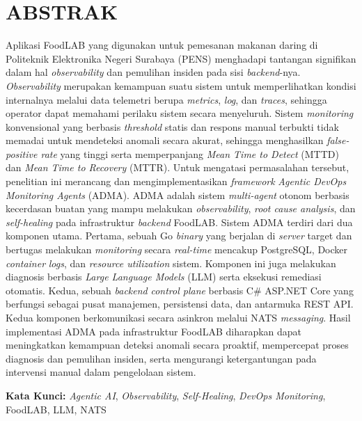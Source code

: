 \cleardoublepage
\chapter*{ABSTRAK}
\thispagestyle{fancy}

Aplikasi FoodLAB yang digunakan untuk pemesanan makanan daring di Politeknik Elektronika Negeri Surabaya (PENS) menghadapi tantangan signifikan dalam hal \textit{observability} dan pemulihan insiden pada sisi \textit{backend}-nya. \textit{Observability} merupakan kemampuan suatu sistem untuk memperlihatkan kondisi internalnya melalui data telemetri berupa \textit{metrics}, \textit{log}, dan \textit{traces}, sehingga operator dapat memahami perilaku sistem secara menyeluruh. Sistem \textit{monitoring} konvensional yang berbasis \textit{threshold} statis dan respons manual terbukti tidak memadai untuk mendeteksi anomali secara akurat, sehingga menghasilkan \textit{false-positive rate} yang tinggi serta memperpanjang \textit{Mean Time to Detect} (MTTD) dan \textit{Mean Time to Recovery} (MTTR). Untuk mengatasi permasalahan tersebut, penelitian ini merancang dan mengimplementasikan \textit{framework} \textit{Agentic DevOps Monitoring Agents} (ADMA). ADMA adalah sistem \textit{multi-agent} otonom berbasis kecerdasan buatan yang mampu melakukan \textit{observability}, \textit{root cause analysis}, dan \textit{self-healing} pada infrastruktur \textit{backend} FoodLAB. Sistem ADMA terdiri dari dua komponen utama. Pertama, sebuah Go \textit{binary} yang berjalan di \textit{server} target dan bertugas melakukan \textit{monitoring} secara \textit{real-time} mencakup PostgreSQL, Docker \textit{container} \textit{logs}, dan \textit{resource utilization} sistem. Komponen ini juga melakukan diagnosis berbasis \textit{Large Language Models} (LLM) serta eksekusi remediasi otomatis. Kedua, sebuah \textit{backend} \textit{control plane} berbasis C\# ASP.NET Core yang berfungsi sebagai pusat manajemen, persistensi data, dan antarmuka REST API. Kedua komponen berkomunikasi secara asinkron melalui NATS \textit{messaging}. Hasil implementasi ADMA pada infrastruktur FoodLAB diharapkan dapat meningkatkan kemampuan deteksi anomali secara proaktif, mempercepat proses diagnosis dan pemulihan insiden, serta mengurangi ketergantungan pada intervensi manual dalam pengelolaan sistem.

\vspace{1cm}
\noindent\textbf{Kata Kunci:} \textit{Agentic AI}, \textit{Observability}, \textit{Self-Healing}, \textit{DevOps Monitoring}, FoodLAB, LLM, NATS